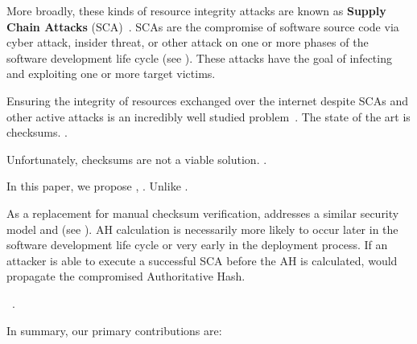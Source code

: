 More broadly, these kinds of resource integrity attacks are known as
\textbf{Supply Chain Attacks} (SCA)~\cite{}. SCAs are the compromise of software
source code via cyber attack, insider threat, or other attack on one or more
phases of the software development life cycle (see ). These
attacks have the goal of infecting and exploiting one or more target victims.

Ensuring the integrity of resources exchanged over the internet despite SCAs and
other active attacks is an incredibly well studied problem~\cite{MD5Header,
HTTP1.1, HTTPS, SRI, LF, OpenPGP1, DNSSEC}. The state of the art is checksums.
.

Unfortunately, checksums are not a viable solution. .

In this paper, we propose \SYSTEM{}, . Unlike .

As a replacement for manual checksum verification, \SYSTEM{} addresses a similar
security model and   (see ). AH calculation is necessarily more
likely to occur later in the software development life cycle or very early in
the deployment process. If an attacker is able to execute a successful SCA
before the AH is calculated, \SYSTEM{} would propagate the compromised
Authoritative Hash.

~\cite{DNSSEC}.


In summary, our primary contributions are:

